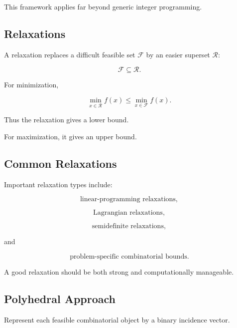 This framework applies far beyond generic integer programming.

\subsection{Relaxations}
\label{subsec:combinatorial-relaxations}

A relaxation replaces a difficult feasible set \(\mathcal{F}\) by an
easier superset \(\mathcal{R}\):

\[
\boxed{
\mathcal{F}
\subseteq
\mathcal{R}.
}
\]

For minimization,

\[
\boxed{
\min_{x\in\mathcal{R}}
f(x)
\leq
\min_{x\in\mathcal{F}}
f(x).
}
\]

Thus the relaxation gives a lower bound.

For maximization, it gives an upper bound.

\subsection{Common Relaxations}
\label{subsec:common-combinatorial-relaxations}

Important relaxation types include:

\[
\boxed{
\text{linear-programming relaxations},
}
\]

\[
\boxed{
\text{Lagrangian relaxations},
}
\]

\[
\boxed{
\text{semidefinite relaxations},
}
\]

and

\[
\boxed{
\text{problem-specific combinatorial bounds}.
}
\]

A good relaxation should be both strong and computationally manageable.

\subsection{Polyhedral Approach}
\label{subsec:polyhedral-combinatorial-optimization}

Represent each feasible combinatorial object by a binary incidence vector.

